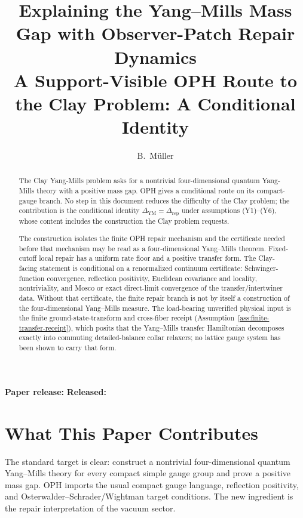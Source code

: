 \documentclass[11pt]{article}
\title{\textbf{Explaining the Yang--Mills Mass Gap with Observer-Patch Repair Dynamics}\\
\large A Support-Visible OPH Route to the Clay Problem: A Conditional Identity}
\author{B.\ M\"uller}
\date{}
\numberwithin{equation}{section}
\theoremstyle{remark}
\newcommand{\YM}{\mathrm{YM}}
\begin{document}
\maketitle
\begin{center}
\small\textbf{Paper release:} \OPHPaperReleaseID\quad
\textbf{Released:} \OPHPaperReleaseDate
\end{center}

\begin{abstract}
The Clay Yang-Mills problem asks for a nontrivial four-dimensional quantum Yang-Mills theory with a positive mass gap. OPH gives a conditional route on its compact-gauge branch. No step in this document reduces the difficulty of the Clay problem; the contribution is the conditional identity \(\Delta_{\YM}=\Delta_{\mathrm{rep}}\) under assumptions (Y1)--(Y6), whose content includes the construction the Clay problem requests.

The construction isolates the finite OPH repair mechanism and the certificate needed before that
mechanism may be read as a four-dimensional Yang--Mills theorem. Fixed-cutoff local repair has a
uniform rate floor and a positive transfer form. The Clay-facing statement is conditional on a
renormalized continuum certificate: Schwinger-function convergence, reflection positivity,
Euclidean covariance and locality, nontriviality, and Mosco or exact direct-limit convergence of
the transfer/intertwiner data. Without that certificate, the finite repair branch is not by itself
a construction of the four-dimensional Yang--Mills measure. The load-bearing unverified physical
input is the finite ground-state-transform and cross-fiber receipt
(Assumption~\ref{ass:finite-transfer-receipt}), which posits that the Yang--Mills transfer
Hamiltonian decomposes exactly into commuting detailed-balance collar relaxers; no lattice gauge
system has been shown to carry that form.
\end{abstract}

\section*{What This Paper Contributes}

The standard target is clear: construct a nontrivial four-dimensional quantum Yang--Mills theory
for every compact simple gauge group and prove a positive mass gap. OPH imports the usual compact
gauge language, reflection positivity, and Osterwalder--Schrader/Wightman target conditions. The
new ingredient is the repair interpretation of the vacuum sector.
\end{document}

